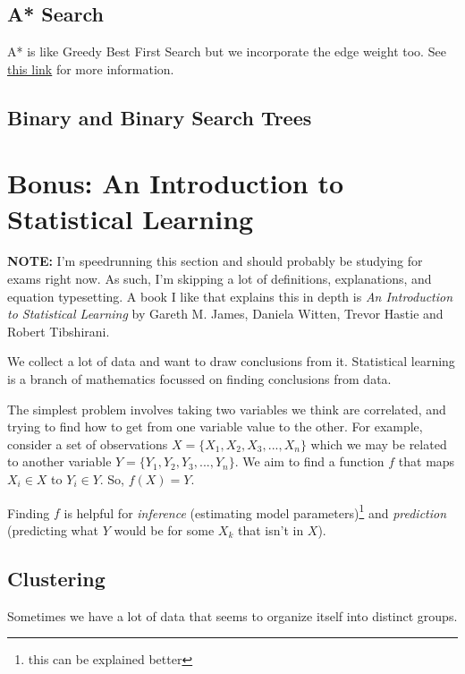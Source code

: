 \documentclass{tufte-handout}
\begin{document}
\subsection{A* Search}
A* is like Greedy Best First Search but we incorporate the edge weight
too. See
\href{https://theory.stanford.edu/~amitp/GameProgramming/AStarComparison.html}{this
link} for more information.

\subsection{Binary and Binary Search Trees}


\section{Bonus: An Introduction to Statistical Learning}
\textcolor{pinkishpurple}{\textbf{NOTE:} I'm speedrunning this section and should probably be studying for exams right now. As such, I'm skipping a lot of definitions, explanations, and equation typesetting. A book I like that explains this in depth is \textit{An Introduction to Statistical Learning} by Gareth M. James, Daniela Witten, Trevor Hastie and Robert Tibshirani. }


We collect a lot of data and want to draw conclusions from it. Statistical learning is a branch of mathematics focussed on finding conclusions from data.

The simplest problem involves taking two variables we think are correlated, and trying to find how to get from one variable value to the other. For example, consider a set of observations $X=\{X_1, X_2, X_3,..., X_n\}$ which we may be related to another variable $Y=\{Y_1, Y_2, Y_3, ..., Y_n\}$. We aim to find a function $f$ that maps $X_i \in X$ to $Y_i \in Y$. So, $f(X) = Y$.

Finding $f$ is helpful for \textit{inference} (estimating model parameters)\footnote{this can be explained better} and \textit{prediction} (predicting what $Y$ would be for some $X_k$ that isn't in $X$).

\subsection{Clustering}
Sometimes we have a lot of data that seems to organize itself into distinct groups.
\end{document}

